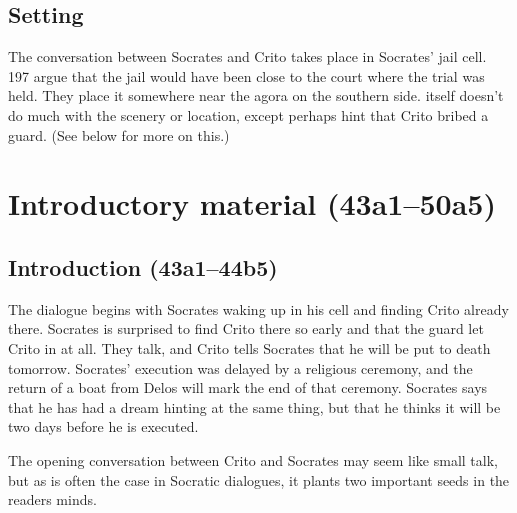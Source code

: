 \documentclass[11pt]{article}
\begin{document}

\subsection{Setting}

The conversation between Socrates and Crito takes place in Socrates' jail
cell.  \citet{brickhouse2004} 197 argue that the jail would have been close
to the court where the trial was held.  They place it somewhere near the
agora on the southern side.   itself doesn't do much with the
scenery or location, except perhaps hint that Crito bribed a guard.  (See
below for more on this.)



\section{Introductory material (43a1--50a5)}

\subsection{Introduction (43a1--44b5)}

The dialogue begins with Socrates waking up in his cell and finding Crito
already there.  Socrates is surprised to find Crito there so early and that
the guard let Crito in at all.  They talk, and Crito tells Socrates that he
will be put to death tomorrow.  Socrates' execution was delayed by
a religious ceremony, and the return of a boat from Delos will mark the end
of that ceremony.  Socrates says that he has had a dream hinting at the
same thing, but that he thinks it will be two days before he is executed.

The opening conversation between Crito and Socrates may seem like small
talk, but as is often the case in Socratic dialogues, it plants two
important seeds in the readers minds.
\end{document}
